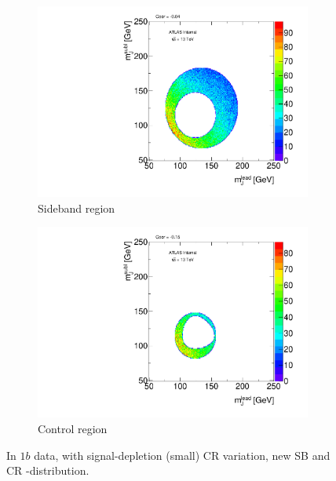 \begin{figure}[htbp!]
\centering
\captionsetup{justification=centering}
    \begin{subfigure}[b]{0.45\textwidth}
        \includegraphics[width=\textwidth,angle=-90]{figures/boosted/Syst_CRSB/CR_Small_Sideband_OneTag_mH0H1.pdf}
        \caption{Sideband region}
        \label{CRSB:CR_Small_SB}
    \end{subfigure}
    \quad
    \begin{subfigure}[b]{0.45\textwidth}
        \includegraphics[width=\textwidth,angle=-90]{figures/boosted/Syst_CRSB/CR_Small_Control_OneTag_mH0H1.pdf}
        \caption{Control region}
        \label{CRSB:CR_Small_CR}
    \end{subfigure}
\caption{In $1b$ data, with signal-depletion (small) CR variation, new SB and CR \mleadJ-\msublJ distribution.}
\label{CRSB:CR_Small}
\end{figure}

